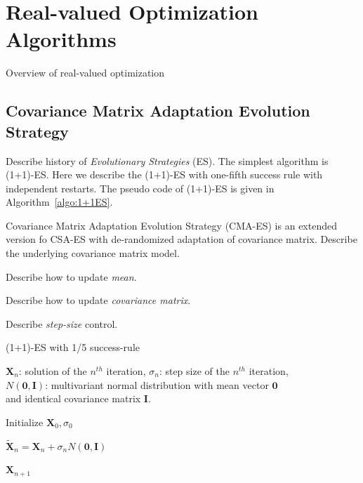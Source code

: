 \chapter{Real-valued Optimization Algorithms}
\label{chapter:algos}

Overview of real-valued optimization

\section{Covariance Matrix Adaptation Evolution Strategy}

Describe history of \textit{Evolutionary Strategies} (ES).
The simplest algorithm is (1+1)-ES.
Here we describe the (1+1)-ES with one-fifth success rule with independent restarts.
The pseudo code of (1+1)-ES is given in Algorithm~\ref{algo:1+1ES}.

Covariance Matrix Adaptation Evolution Strategy (CMA-ES) is an extended version fo CSA-ES with de-randomized adaptation of covariance matrix.
Describe the underlying covariance matrix model.

Describe how to update \textit{mean}.

Describe how to update \textit{covariance matrix}.

Describe \textit{step-size} control.



\begin{algorithm}%
\caption{(1+1)-ES with 1/5 success-rule}\label{algo:1+1ES}

$\boldsymbol{X}_{n}$: solution of the $n^{th}$ iteration, $\sigma_n$: step size of the $n^{th}$ iteration, \\
$N(\boldsymbol{0}, \boldsymbol{I})$: multivariant normal distribution with mean vector $\boldsymbol{0}$ \\ 
and identical covariance matrix $\boldsymbol{I}$.

\BlankLine
{} 

\BlankLine
Initialize $\boldsymbol{X}_0, \sigma_0$ \\
 {

    $\widetilde{\boldsymbol{X}}_n = \boldsymbol{X}_n + \sigma_n N(\boldsymbol{0}, \boldsymbol{I})$  \\

}

\Return $\boldsymbol{X}_{n+1}$

\end{algorithm}






